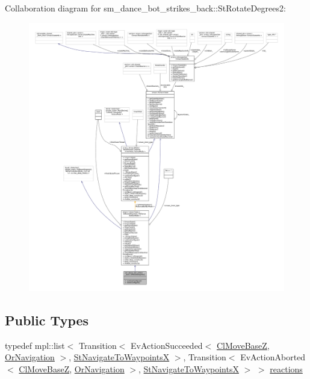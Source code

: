 Collaboration diagram for sm\+\_\+dance\+\_\+bot\+\_\+strikes\+\_\+back\+:\+:St\+Rotate\+Degrees2\+:
\nopagebreak
\begin{figure}[H]
\begin{center}
\leavevmode
\includegraphics[width=350pt]{structsm__dance__bot__strikes__back_1_1StRotateDegrees2__coll__graph}
\end{center}
\end{figure}
\subsection*{Public Types}
\begin{DoxyCompactItemize}
\item 
typedef mpl\+::list$<$ Transition$<$ Ev\+Action\+Succeeded$<$ \hyperlink{classmove__base__z__client_1_1ClMoveBaseZ}{Cl\+Move\+BaseZ}, \hyperlink{classsm__dance__bot__strikes__back_1_1OrNavigation}{Or\+Navigation} $>$, \hyperlink{structsm__dance__bot__strikes__back_1_1StNavigateToWaypointsX}{St\+Navigate\+To\+WaypointsX} $>$, Transition$<$ Ev\+Action\+Aborted$<$ \hyperlink{classmove__base__z__client_1_1ClMoveBaseZ}{Cl\+Move\+BaseZ}, \hyperlink{classsm__dance__bot__strikes__back_1_1OrNavigation}{Or\+Navigation} $>$, \hyperlink{structsm__dance__bot__strikes__back_1_1StNavigateToWaypointsX}{St\+Navigate\+To\+WaypointsX} $>$ $>$ \hyperlink{structsm__dance__bot__strikes__back_1_1StRotateDegrees2_a15ea014ebb51ef518b9d757812973351}{reactions}
\end{DoxyCompactItemize}
